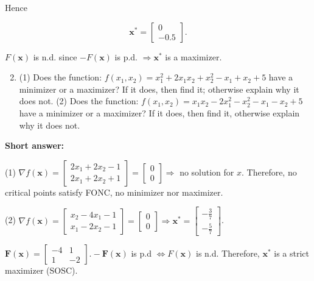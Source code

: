 Hence

\begin{equation*}
	\boldsymbol{x}^{*}=\left[\begin{array}{c}
		0 \\
		-0.5
	\end{array}\right] .
\end{equation*}

\(F(\boldsymbol{x})\) is n.d. since \(-F(\boldsymbol{x})\) is p.d. \(\Rightarrow \boldsymbol{x}^{*}\) is a maximizer.

\medskip
\noindent
\begin{enumerate}
	\setcounter{enumi}{1}
	\item 
	(1) Does the function: \(f\left(x_{1}, x_{2}\right)=x_{1}^{2}+2 x_{1} x_{2}+x_{2}^{2}-x_{1}+x_{2}+5\) have a minimizer or a maximizer? If it does, then find it; otherwise explain why it does not. (2) Does the function: \(f\left(x_{1}, x_{2}\right)=x_{1} x_{2}-2 x_{1}^{2}-x_{2}^{2}-x_{1}-x_{2}+5\) have a minimizer or a maximizer? If it does, then find it, otherwise explain why it does not.
	
\end{enumerate}


\textbf{Short answer:}

(1) \(\nabla f(\boldsymbol{x})=\left[\begin{array}{l}2 x_{1}+2 x_{2}-1 \\ 2 x_{1}+2 x_{2}+1\end{array}\right]=\left[\begin{array}{l}0 \\ 0\end{array}\right] \Rightarrow\) no solution for \(x\). Therefore, no critical points satisfy FONC, no minimizer nor maximizer.

(2) \(\nabla f(\boldsymbol{x})=\left[\begin{array}{l}x_{2}-4 x_{1}-1 \\ x_{1}-2 x_{2}-1\end{array}\right]=\left[\begin{array}{l}0 \\ 0\end{array}\right] \Rightarrow \boldsymbol{x}^{*}=\left[\begin{array}{l}-\frac{3}{7} \\ -\frac{5}{7}\end{array}\right]\).

\(\boldsymbol{F} (\boldsymbol{x})=\left[\begin{array}{cc}-4 & 1 \\ 1 & -2\end{array}\right] .-\boldsymbol{F} (\boldsymbol{x})\) is p.d \(\Leftrightarrow F(\boldsymbol{x})\) is n.d. Therefore, \(\boldsymbol{x}^{*}\) is a strict maximizer (SOSC).


